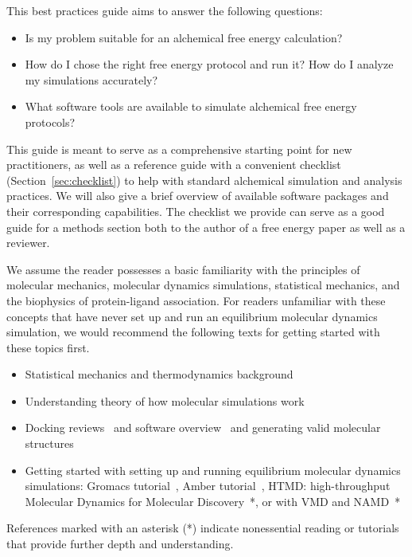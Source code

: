 \documentclass[9pt,bestpractices]{livecoms}
\begin{document}
This best practices guide aims to answer the following questions:
\begin{itemize}
    \item Is my problem suitable for an alchemical free energy calculation? 
    \item How do I chose the right free energy protocol and run it? How do I analyze my simulations accurately? 
    \item What software tools are available to simulate alchemical free energy protocols? 
\end{itemize}
This guide is meant to serve as a comprehensive starting point for new practitioners, as well as a reference guide with a convenient checklist (Section~\ref{sec:checklist}) to help with standard alchemical simulation and analysis practices. 
We will also give a brief overview of available software packages and their corresponding capabilities. 
The checklist we provide can serve as a good guide for a methods section both to the author of a free energy paper as well as a reviewer. 

We assume the reader possesses a basic familiarity with the principles of molecular mechanics, molecular dynamics simulations, statistical mechanics, and the biophysics of protein-ligand association.
For readers unfamiliar with these concepts that have never set up and run an equilibrium molecular dynamics simulation, we would recommend the following texts for getting started with these topics first. 
\begin{itemize}
    \item Statistical mechanics and thermodynamics background~\cite{hill1956statistical, alavi2011statistical}
    \item Understanding theory of how molecular simulations work~\cite{frenkel2002understanding}
    \item Docking reviews~\cite{yuriev2013latest, meng2011molecular} and software overview~\cite{pagadala2017software} and generating valid molecular structures ~\cite{loeffler2015fesetup}
    \item Getting started with setting up and running equilibrium molecular dynamics simulations: Gromacs tutorial~\cite{lemkul2018From}, Amber tutorial~\cite{amber}, HTMD: high-throughput Molecular Dynamics for Molecular Discovery~\cite{doerr2016htmd}*, or with VMD and NAMD~\cite{ribeiro2016easy}*
\end{itemize}
References marked with an asterisk (*) indicate nonessential reading or tutorials that provide further depth and understanding.
\end{document}
